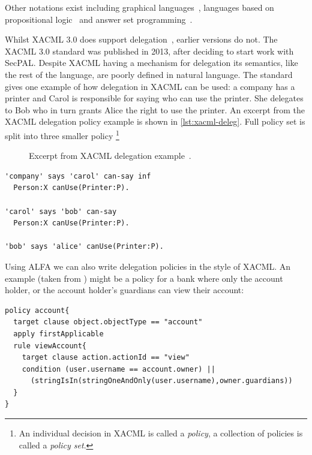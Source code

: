 \documentclass[thesis.tex]{subfiles}
\begin{document}
Other notations exist including graphical
languages~\cite{henrik_nergaard_scratch-based_2015}, languages based on
propositional logic~\cite{zhang_synthesising_2004} and answer set
programming~\cite{ramli_xacml_2012}.

Whilst XACML 3.0 does support delegation~\cite{oasis_xacml_2010}, earlier
versions do not. The XACML 3.0 standard was published in 2013, after deciding to
start work with SecPAL. Despite XACML having a mechanism for delegation its
semantics, like the rest of the language, are poorly defined in natural
language. The standard gives one example of how delegation in XACML can be used:
a company has a printer and Carol is responsible for saying who can use the
printer. She delegates to Bob who in turn grants Alice the right to use the
printer. An excerpt from the XACML delegation policy example is shown in
\autoref{lst:xacml-deleg}. Full policy set is split into three smaller
policy \footnote{An individual decision in XACML is called a \emph{policy}, a
collection of policies is called a \emph{policy set}.}

\begin{figure}
  \begin{minipage}{0.85\textwidth}
  \begin{mdframed}
      
  \end{mdframed}
  \end{minipage}
  \caption[Excerpt from XACML delegation example.]{Excerpt from XACML delegation example~\cite{oasis_xacml_2010}.}
  \label{lst:xacml-deleg}
\end{figure}

\begin{lstlisting}
'company' says 'carol' can-say inf
  Person:X canUse(Printer:P).

'carol' says 'bob' can-say
  Person:X canUse(Printer:P).

'bob' says 'alice' canUse(Printer:P).
\end{lstlisting}

Using ALFA we can also write delegation policies in the style of
XACML.  An example (taken from \cite{axiomatics_going_2016}) might be
a policy for a bank where only the account holder, or the account
holder's guardians can view their account:

\begin{lstlisting}
policy account{ 
  target clause object.objectType == "account"
  apply firstApplicable
  rule viewAccount{ 
    target clause action.actionId == "view"
    condition (user.username == account.owner) ||
      (stringIsIn(stringOneAndOnly(user.username),owner.guardians))
  }
}
\end{lstlisting}
\end{document}
